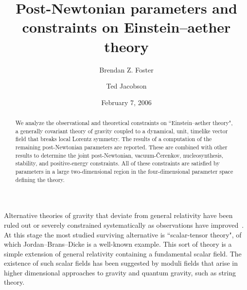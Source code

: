 \documentclass[aps,prd,preprint,amsmath,amssymb]{revtex4}
\begin{document}
%
\title{Post-Newtonian parameters and
constraints on Einstein--aether theory}
%
\author{Brendan Z. Foster}
\author{Ted Jacobson}


\date{February 7, 2006}
%
%
\begin{abstract}
%
%
We analyze the observational and theoretical constraints on
 ``Einstein--aether theory", a generally covariant theory
 of gravity coupled to a dynamical,
unit, timelike vector field that breaks local Lorentz symmetry.
The results of a computation of the remaining post-Newtonian
parameters are reported. These are combined with other results to
determine the joint post-Newtonian, vacuum-\v{C}erenkov,
nucleosynthesis, stability, and positive-energy constraints. All
of these constraints are satisfied by parameters in a large
two-dimensional region in the four-dimensional parameter space
defining the theory.
\end{abstract}
%
%
\maketitle
%
%
\section*{}
%
%
Alternative theories of gravity that deviate from general
relativity have been ruled out or severely constrained
systematically as observations have improved~\cite{WillBook,
WillReview}. At this stage the most studied surviving alternative
is ``scalar-tensor theory", of which Jordan--Brans--Dicke is a
well-known example. This sort of theory is a simple extension of
general relativity containing a fundamental scalar field. The
existence of such scalar fields has been suggested by moduli
fields that arise in higher dimensional approaches to gravity and
quantum gravity, such as string theory.
\end{document}

